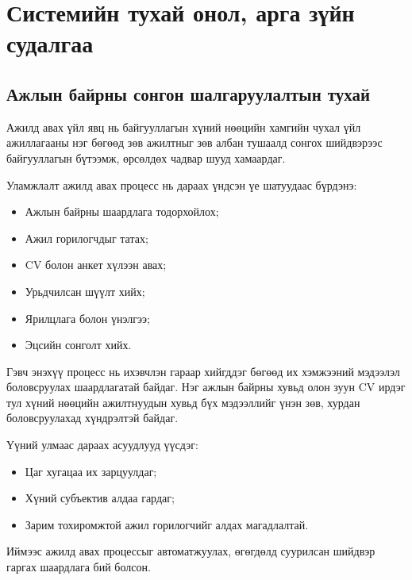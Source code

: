 
\chapter{Системийн тухай онол, арга зүйн судалгаа} %
\label{Chapter1} %


\newcommand{\keyword}[1]{\textbf{#1}}
\newcommand{\tabhead}[1]{\textbf{#1}}
\newcommand{\code}[1]{\texttt{#1}}
\newcommand{\file}[1]{\texttt{\bfseries#1}}
\newcommand{\option}[1]{\texttt{\itshape#1}}




\section{Ажлын байрны сонгон шалгаруулалтын тухай}
\par{}
Ажилд авах үйл явц нь байгууллагын хүний нөөцийн хамгийн чухал үйл ажиллагааны нэг бөгөөд зөв ажилтныг зөв албан тушаалд сонгох шийдвэрээс байгууллагын бүтээмж, өрсөлдөх чадвар шууд хамаардаг.

Уламжлалт ажилд авах процесс нь дараах үндсэн үе шатуудаас бүрдэнэ:
\begin{itemize}
    \item Ажлын байрны шаардлага тодорхойлох;
    \item Ажил горилогчдыг татах;
    \item CV болон анкет хүлээн авах;
    \item Урьдчилсан шүүлт хийх;
    \item Ярилцлага болон үнэлгээ;
    \item Эцсийн сонголт хийх.
\end{itemize}

\par{}Гэвч энэхүү процесс нь ихэвчлэн гараар хийгддэг бөгөөд их хэмжээний мэдээлэл боловсруулах шаардлагатай байдаг. Нэг ажлын байрны хувьд олон зуун CV ирдэг тул хүний нөөцийн ажилтнуудын хувьд бүх мэдээллийг үнэн зөв, хурдан боловсруулахад хүндрэлтэй байдаг.

Үүний улмаас дараах асуудлууд үүсдэг:
\begin{itemize}
    \item Цаг хугацаа их зарцуулдаг;
    \item Хүний субъектив алдаа гардаг;
    \item Зарим тохиромжтой ажил горилогчийг алдах магадлалтай.
\end{itemize}
Иймээс ажилд авах процессыг автоматжуулах, өгөгдөлд суурилсан шийдвэр гаргах шаардлага бий болсон.

